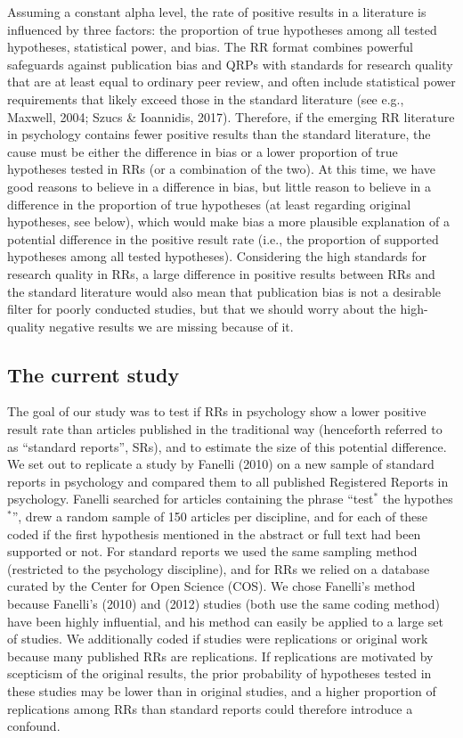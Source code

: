 \documentclass[british,,man,floatsintext]{apa6}
\begin{document}
Assuming a constant alpha level, the rate of positive results in a literature is influenced by three factors: the proportion of true hypotheses among all tested hypotheses, statistical power, and bias.
The RR format combines powerful safeguards against publication bias and QRPs with standards for research quality that are at least equal to ordinary peer review, and often include statistical power requirements that likely exceed those in the standard literature (see e.g., Maxwell, 2004; Szucs \& Ioannidis, 2017).
Therefore, if the emerging RR literature in psychology contains fewer positive results than the standard literature, the cause must be either the difference in bias or a lower proportion of true hypotheses tested in RRs (or a combination of the two).
At this time, we have good reasons to believe in a difference in bias, but little reason to believe in a difference in the proportion of true hypotheses (at least regarding original hypotheses, see below), which would make bias a more plausible explanation of a potential difference in the positive result rate (i.e., the proportion of supported hypotheses among all tested hypotheses).
Considering the high standards for research quality in RRs, a large difference in positive results between RRs and the standard literature would also mean that publication bias is not a desirable filter for poorly conducted studies, but that we should worry about the high-quality negative results we are missing because of it.

\hypertarget{the-current-study}{%
\subsection{The current study}\label{the-current-study}}

The goal of our study was to test if RRs in psychology show a lower positive result rate than articles published in the traditional way (henceforth referred to as \enquote{standard reports}, SRs), and to estimate the size of this potential difference.
We set out to replicate a study by Fanelli (2010) on a new sample of standard reports in psychology and compared them to all published Registered Reports in psychology.
Fanelli searched for articles containing the phrase \enquote{test\(^\ast\) the hypothes\(^\ast\)}, drew a random sample of 150 articles per discipline, and for each of these coded if the first hypothesis mentioned in the abstract or full text had been supported or not.
For standard reports we used the same sampling method (restricted to the psychology discipline), and for RRs we relied on a database curated by the Center for Open Science (COS).
We chose Fanelli's method because Fanelli's (2010) and (2012) studies (both use the same coding method) have been highly influential, and his method can easily be applied to a large set of studies.
We additionally coded if studies were replications or original work because many published RRs are replications.
If replications are motivated by scepticism of the original results, the prior probability of hypotheses tested in these studies may be lower than in original studies, and a higher proportion of replications among RRs than standard reports could therefore introduce a confound.
\end{document}
